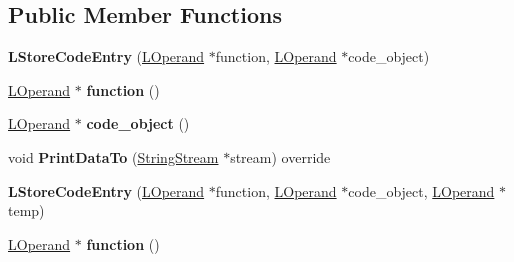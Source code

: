 \subsection*{Public Member Functions}
\begin{DoxyCompactItemize}
\item 
{\bfseries L\+Store\+Code\+Entry} (\hyperlink{classv8_1_1internal_1_1_l_operand}{L\+Operand} $\ast$function, \hyperlink{classv8_1_1internal_1_1_l_operand}{L\+Operand} $\ast$code\+\_\+object)\hypertarget{classv8_1_1internal_1_1_l_store_code_entry_aaf96cdc9f56546a0e460ccfc7b95e1f1}{}\label{classv8_1_1internal_1_1_l_store_code_entry_aaf96cdc9f56546a0e460ccfc7b95e1f1}

\item 
\hyperlink{classv8_1_1internal_1_1_l_operand}{L\+Operand} $\ast$ {\bfseries function} ()\hypertarget{classv8_1_1internal_1_1_l_store_code_entry_a864f2ea5e3b25989bb3366d09c523843}{}\label{classv8_1_1internal_1_1_l_store_code_entry_a864f2ea5e3b25989bb3366d09c523843}

\item 
\hyperlink{classv8_1_1internal_1_1_l_operand}{L\+Operand} $\ast$ {\bfseries code\+\_\+object} ()\hypertarget{classv8_1_1internal_1_1_l_store_code_entry_a59ea37ff8315982d7ff3a2b177c70e07}{}\label{classv8_1_1internal_1_1_l_store_code_entry_a59ea37ff8315982d7ff3a2b177c70e07}

\item 
void {\bfseries Print\+Data\+To} (\hyperlink{classv8_1_1internal_1_1_string_stream}{String\+Stream} $\ast$stream) override\hypertarget{classv8_1_1internal_1_1_l_store_code_entry_a8fad8edaa1b22ad4a43d20eb1c01ec87}{}\label{classv8_1_1internal_1_1_l_store_code_entry_a8fad8edaa1b22ad4a43d20eb1c01ec87}

\item 
{\bfseries L\+Store\+Code\+Entry} (\hyperlink{classv8_1_1internal_1_1_l_operand}{L\+Operand} $\ast$function, \hyperlink{classv8_1_1internal_1_1_l_operand}{L\+Operand} $\ast$code\+\_\+object, \hyperlink{classv8_1_1internal_1_1_l_operand}{L\+Operand} $\ast$temp)\hypertarget{classv8_1_1internal_1_1_l_store_code_entry_a6226a65dc8255c208458a71ea0fca731}{}\label{classv8_1_1internal_1_1_l_store_code_entry_a6226a65dc8255c208458a71ea0fca731}

\item 
\hyperlink{classv8_1_1internal_1_1_l_operand}{L\+Operand} $\ast$ {\bfseries function} ()\hypertarget{classv8_1_1internal_1_1_l_store_code_entry_a864f2ea5e3b25989bb3366d09c523843}{}\label{classv8_1_1internal_1_1_l_store_code_entry_a864f2ea5e3b25989bb3366d09c523843}


\end{DoxyCompactItemize}

